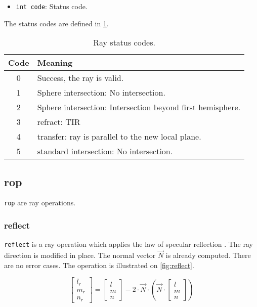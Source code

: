 \begin{itemize}
\item \lstinline{int code}: Status code.
\end{itemize}

The status codes are defined in \cref{tab:ray-status-codes}.

\begin{table} \caption{\label{tab:ray-status-codes} Ray status codes.}
\begin{tabular}{| c | l |} \hline
\textbf{Code} & \textbf{Meaning} \\ \hline
0 & Success, the ray is valid.\\ \hline
1 & Sphere intersection: No intersection. \\ \hline
2 & Sphere intersection: Intersection beyond first hemisphere. \\ \hline
3 & refract: \gls{TIR} \\ \hline
4 & transfer: ray is parallel to the new local plane. \\ \hline
5 & standard intersection: No intersection. \\ \hline
\end{tabular} \end{table}

\subsection{rop}
\lstinline{rop} are ray operations.

\subsubsection{reflect}
\lstinline{reflect} is a ray operation which applies the law of specular
reflection \cite{wiki:specular-reflection}. The ray direction is modified in
place. The normal vector $\overrightarrow{N}$ is already computed. There are
no error cases. The operation is illustrated on \cref{fig:reflect}.

\begin{equation}
\begin{bmatrix} l_r \\ m_r \\ n_r \end{bmatrix} =
\begin{bmatrix} l \\ m \\ n \end{bmatrix} - 2 \cdot
\overrightarrow{N} \cdot \left( \overrightarrow{N} \cdot
\begin{bmatrix} l \\ m \\ n \end{bmatrix} \right)
\end{equation}

